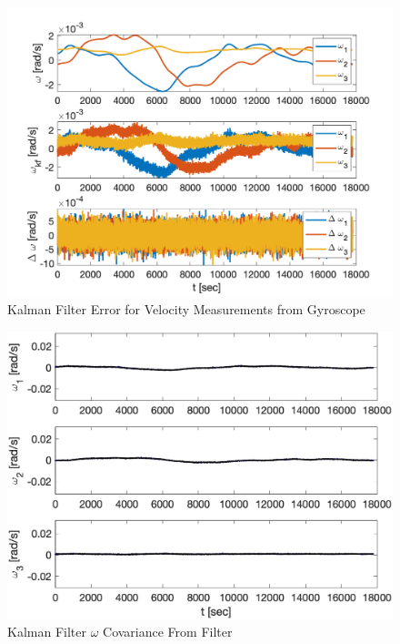 \begin{figure}[H]
    \centering
    \captionsetup{ justification = centering }
    \includegraphics[width = 12cm]{Images/PS8/kalman_filter_meas_update_error_velocities.png}
    \caption{Kalman Filter Error for Velocity Measurements from Gyroscope}
    \label{fig:kalman_error_attitude}
\end{figure}

\begin{figure}[H]
    \centering
    \captionsetup{ justification = centering }
    \includegraphics[width = 12cm]{Images/PS8/kalman_filter_meas_update_omega_cov_bounds.png}
    \caption{Kalman Filter $\omega$ Covariance From Filter}
    \label{fig:kalman_omega_cov}
\end{figure}

